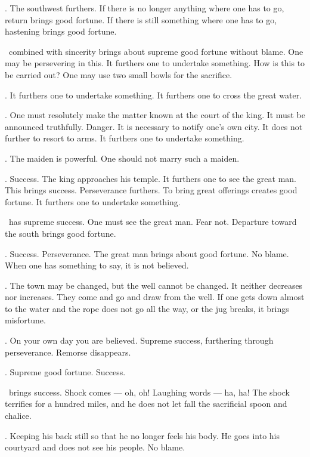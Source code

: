 {\nameit. The southwest furthers.
 If there is no longer anything where one has to go,
 return brings good fortune.
 If there is still something where one has to go,
 hastening brings good fortune.}

{\nameit\ combined with sincerity
 brings about supreme good fortune
 without blame.
 One may be persevering in this.
 It furthers one to undertake something.
 How is this to be carried out?
 One may use two small bowls for the sacrifice.}

{\nameit. It furthers one
 to undertake something.
 It furthers one to cross the great water.}

{\nameit. One must resolutely make the matter known
 at the court of the king.
 It must be announced truthfully. Danger.
 It is necessary to notify one’s own city.
 It does not further to resort to arms.
 It furthers one to undertake something.}

{\nameit. The maiden is powerful.
 One should not marry such a maiden.}

{\nameit. Success.
 The king approaches his temple.
 It furthers one to see the great man.
 This brings success. Perseverance furthers.
 To bring great offerings creates good fortune.
 It furthers one to undertake something.}

{\nameit\ has supreme success.
 One must see the great man.
 Fear not.
 Departure toward the south
 brings good fortune.}

{\nameit. Success. Perseverance.
 The great man brings about good fortune.
 No blame.
 When one has something to say,
 it is not believed.}

{\nameit. The town may be changed,
 but the well cannot be changed.
 It neither decreases nor increases.
 They come and go and draw from the well.
 If one gets down almost to the water
 and the rope does not go all the way,
 or the jug breaks, it brings misfortune.}

{\nameit. On your own day
 you are believed.
 Supreme success,
 furthering through perseverance.
 Remorse disappears.}

{\nameit. Supreme good fortune.
 Success.}

{\nameit\ brings success.
 Shock comes --- oh, oh!
 Laughing words --- ha, ha!
 The shock terrifies for a hundred miles,
 and he does not let fall the sacrificial spoon and chalice.}

{\nameit. Keeping his back still
 so that he no longer feels his body.
 He goes into his courtyard
 and does not see his people.
 No blame.}

